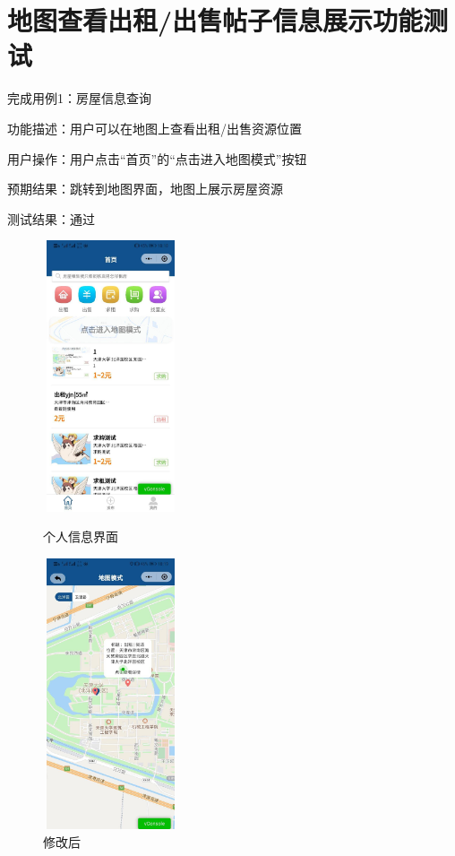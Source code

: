       \section{地图查看出租/出售帖子信息展示功能测试}
      完成用例1：房屋信息查询
   
      功能描述：用户可以在地图上查看出租/出售资源位置
      
      用户操作：用户点击“首页”的“点击进入地图模式”按钮
      
      预期结果：跳转到地图界面，地图上展示房屋资源
      
      测试结果：通过
      
      \begin{figure}[htbp]
          \centering
          \begin{minipage}[t]{0.48\textwidth}
          \centering
          \includegraphics[width=4cm,height=8cm]{test/image/test56.png} 
         \caption{个人信息界面} 
          \end{minipage}
          \begin{minipage}[t]{0.48\textwidth}
           \centering
           \includegraphics[width=4cm,height=8cm]{test/image/test57.png} 
          \caption{修改后} 
           \end{minipage}
          \end{figure}
         \newpage 
